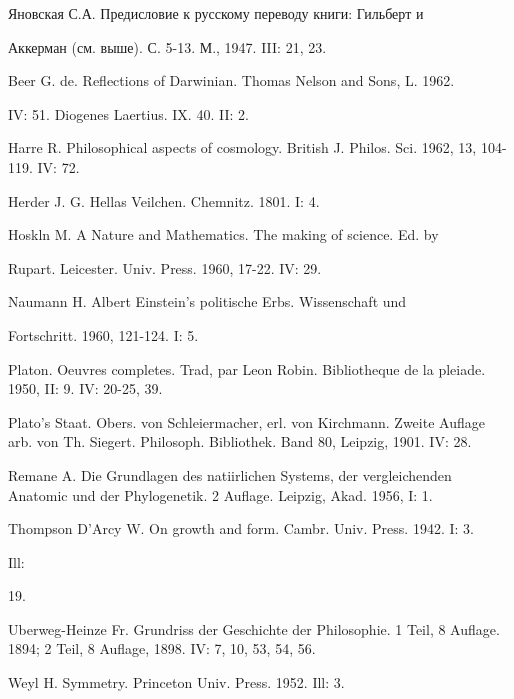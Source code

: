 Яновская С.А. Предисловие к русскому переводу книги: Гильберт и

Аккерман (см. выше). С. 5-13. М., 1947. III: 21, 23.

Beer G. de. Reflections of Darwinian. Thomas Nelson and Sons, L.
1962.

IV: 51. Diogenes Laertius. IX. 40. II: 2.

Harre R. Philosophical aspects of cosmology. British J. Philos. Sci.
1962, 13, 104-119. IV: 72.

Herder J. G. Hellas Veilchen. Chemnitz. 1801. I: 4.

Hoskln M. A Nature and Mathematics. The making of science. Ed. by

Rupart. Leicester. Univ. Press. 1960, 17-22. IV: 29.

Naumann H. Albert Einstein's politische Erbs. Wissenschaft und

Fortschritt. 1960, 121-124. I: 5.

Platon. Oeuvres completes. Trad, par Leon Robin. Bibliotheque de la
pleiade. 1950, II: 9. IV: 20-25, 39.

Plato's Staat. Obers. von Schleiermacher, erl. von Kirchmann. Zweite
Auflage arb. von Th. Siegert. Philosoph. Bibliothek. Band 80, Leipzig,
1901. IV: 28.

Remane A. Die Grundlagen des natiirlichen Systems, der vergleichenden
Anatomic und der Phylogenetik. 2 Auflage. Leipzig, Akad. 1956, I: 1.

Thompson D'Arcy W. On growth and form. Cambr. Univ. Press. 1942. I:
3.

Ill:

19.

Uberweg-Heinze Fr. Grundriss der Geschichte der Philosophie. 1 Teil, 8
Auflage. 1894; 2 Teil, 8 Auflage, 1898. IV: 7, 10, 53, 54, 56.

Weyl H. Symmetry. Princeton Univ. Press. 1952. Ill: 3.

